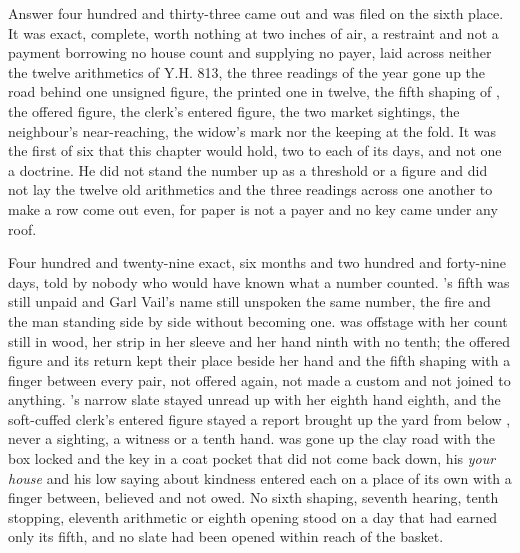 Answer four hundred and thirty-three came out and was filed on the sixth place. It was exact, complete, worth nothing at two inches of air, a restraint and not a payment borrowing no house count and supplying no payer, laid across neither the twelve arithmetics of Y.H. 813, the three readings of the year gone up the road behind one unsigned figure, the printed one in twelve, the fifth shaping of , the offered figure, the clerk's entered figure, the two market sightings, the neighbour's near-reaching, the widow's mark nor the keeping at the fold. It was the first of six that this chapter would hold, two to each of its days, and not one a doctrine. He did not stand the number up as a threshold or a figure and did not lay the twelve old arithmetics and the three readings across one another to make a row come out even, for paper is not a payer and no key came under any roof.

Four hundred and twenty-nine exact, six months and two hundred and forty-nine days, told by nobody who would have known what a number counted. 's fifth was still unpaid and Garl Vail's name still unspoken the same number, the fire and the man standing side by side without becoming one.  was offstage with her count still in wood, her strip in her sleeve and her hand ninth with no tenth; the offered figure and its return kept their place beside her hand and the fifth shaping with a finger between every pair, not offered again, not made a custom and not joined to anything. 's narrow slate stayed unread up  with her eighth hand eighth, and the soft-cuffed clerk's entered figure stayed a report brought up the yard from  below , never a sighting, a witness or a tenth hand.  was gone up the clay road with the box locked and the key in a coat pocket that did not come back down, his \emph{your house} and his low saying about kindness entered each on a place of its own with a finger between, believed and not owed. No sixth shaping, seventh hearing, tenth stopping, eleventh arithmetic or eighth opening stood on a day that had earned only its fifth, and no slate had been opened within reach of the basket.


